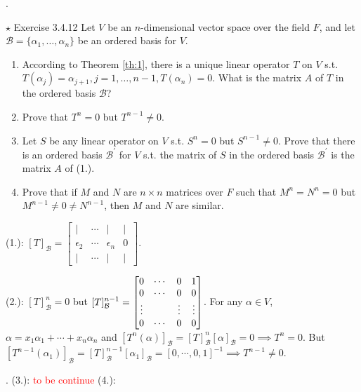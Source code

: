 \documentclass[8pt]{beamer}
\newcommand{\mc}[1]{\mathcal{#1}}
\begin{document}
\begin{frame}{.}
    \begin{block}{$\star$ Exercise 3.4.12}
        Let $V$ be an $n$-dimensional vector space over the field $F$, and let $\mc{B} = \{\alpha_1, \dots, \alpha_n\}$ be an ordered basis for $V$.
        \begin{enumerate}
            \item According to Theorem \ref{th:1}, there is a unique linear operator $T$ on $V$ s.t. $T(\alpha_j) = \alpha_{j+1}, j=1, \dots, n-1,T(\alpha_n) = 0$.
            What is the matrix $A$ of $T$ in the ordered basis $\mc{B}$?
            \item Prove that $T^n = 0$ but $T^{n-1} \neq 0$.
            \item Let $S$ be any linear operator on $V$ s.t. $S^n = 0$ but $S^{n-1} \neq 0$.
            Prove that there is an ordered basis $\mc{B}^\prime$ for $V$ s.t. the matrix of $S$ in the ordered basis $\mc{B}^\prime$ is the matrix $A$ of (1.).
            \item Prove that if $M$ and $N$ are $n \times n$ matrices over $F$ such that $M^n = N^n = 0$ but $M^{n-1} \neq 0 \neq N^{n-1}$, then $M$ and $N$ are similar.
        \end{enumerate}
    \end{block}
    (1.): $[T]_{\mc{B}} = \begin{bmatrix}
     | & \cdots &| & | \\ \epsilon_2 & \cdots &\epsilon_n & 0 \\ | & \cdots & | &|
    \end{bmatrix}$.

    (2.): $[T]^n_{\mc{B}} = 0$ but $[T]^{n-1}_{\mc{B}} = \begin{bmatrix}
        0 & \cdots & 0 & 1 \\ 0 & \cdots & 0 & 0 \\ \vdots & \empty & \vdots & \vdots \\ 0 & \cdots & 0 & 0
    \end{bmatrix}$.
    For any $\alpha \in V$, $\alpha = x_1 \alpha_1 + \cdots + x_n \alpha_n$ and $[T^n (\alpha)]_{\mc{B}} = [T]^n_{\mc{B}} [\alpha]_{\mc{B}} = 0 \implies T^n = 0$.
    But $[T^{n-1}(\alpha_1)]_{\mc{B}} = [T]^{n-1}_{\mc{B}} [\alpha_1]_{\mc{B}} = [0, \cdots, 0, 1]^{-1} \implies T^{n-1} \neq 0$.
\end{frame}

\begin{frame}{.}
    (3.): \textcolor{red}{to be continue}
    (4.): 
\end{frame}
\end{document}
